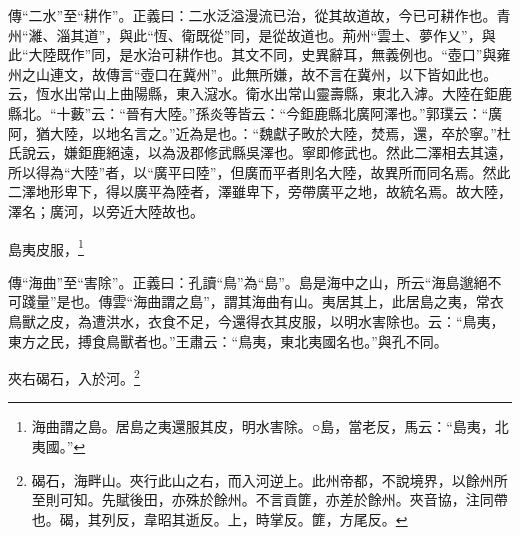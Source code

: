 {\noindent\zhuan{}\fzbyks 傳“二水”至“耕作”。正義曰：二水泛溢漫流已治，從其故道故，今已可耕作也。青州“濰、淄其道”，與此“恆、衛既從”同，是從故道也。荊州“雲土、夢作乂”，與此“大陸既作”同，是水治可耕作也。其文不同，史異辭耳，無義例也。“壺口”與雍州之山連文，故傳言“壺口在冀州”。此無所嫌，故不言在冀州，以下皆如此也。云，恆水出常山上曲陽縣，東入滱水。衛水出常山靈壽縣，東北入滹。大陸在鉅鹿縣北。“十藪”云：“晉有大陸。”孫炎等皆云：“今鉅鹿縣北廣阿澤也。”郭璞云：“廣阿，猶大陸，以地名言之。”近為是也。：“魏獻子畋於大陸，焚焉，還，卒於寧。”杜氏說云，嫌鉅鹿絕遠，以為汲郡修武縣吳澤也。寧即修武也。然此二澤相去其遠，所以得為“大陸”者，以“廣平曰陸”，但廣而平者則名大陸，故異所而同名焉。然此二澤地形卑下，得以廣平為陸者，澤雖卑下，旁帶廣平之地，故統名焉。故大陸，澤名；廣河，以旁近大陸故也。 \par}

島夷皮服，\footnote{海曲謂之島。居島之夷還服其皮，明水害除。○島，當老反，馬云：“島夷，北夷國。”}

{\noindent\zhuan{}\fzbyks 傳“海曲”至“害除”。正義曰：孔讀“鳥”為“島”。島是海中之山，所云“海島邈絕不可踐量”是也。傳雲“海曲謂之島”，謂其海曲有山。夷居其上，此居島之夷，常衣鳥獸之皮，為遭洪水，衣食不足，今還得衣其皮服，以明水害除也。云：“鳥夷，東方之民，搏食鳥獸者也。”王肅云：“鳥夷，東北夷國名也。”與孔不同。 \par}

夾右碣石，入於河。\footnote{碣石，海畔山。夾行此山之右，而入河逆上。此州帝都，不說境界，以餘州所至則可知。先賦後田，亦殊於餘州。不言貢篚，亦差於餘州。夾音協，注同帶也。碣，其列反，韋昭其逝反。上，時掌反。篚，方尾反。}

